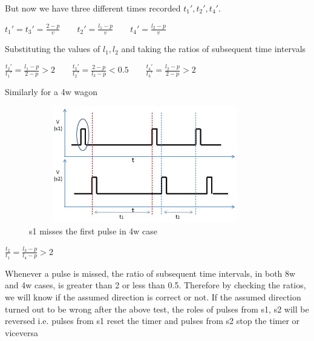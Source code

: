 \documentclass[aps,letterpaper,11pt]{article}
\begin{document}
But now we have three different times recorded $t_1', t_2', t_4'$.
\begin{center}
$
t_1' = t_3' =\frac{2-p}{v} \qquad
t_2' = \frac{l_1-p}{v} \qquad
t_4' = \frac{l_2-p}{v}
$
\end{center}
Substituting the values of $l_1, l_2$ and taking the ratios of subsequent time
intervals
\begin{center}
$
\frac{t_2'}{t_1'} = \frac{l_1-p}{2-p} > 2 \qquad
\frac{t_3'}{t_2'} = \frac{2-p}{l_2-p} < 0.5 \qquad \frac{t_4'}{t_3'} = \frac{l_2-p}{2-p} > 2 $
\end{center}
\mbox{}
Similarly for a 4w wagon
\begin{figure}[H]
\begin{center}
\includegraphics[height = 2in,width=4in,angle=00]{figures/w4_1_pulse_missing.JPG}
\caption{\small s1 misses the first pulse in 4w case}
\end{center}
\end{figure}
\begin{center}$\frac{t_2}{t_1} = \frac{l_3-p}{l_4-p} > 2 $ \end{center}
Whenever a pulse is missed, the ratio of subsequent time intervals, in both 8w and 4w cases, is greater than 2 or less than 0.5. Therefore by checking the ratios, we will know if the assumed direction is correct or not. If the assumed direction turned out to be wrong after the above test, the roles of pulses from s1, s2 will be reversed i.e. pulses from s1 reset the timer and pulses from s2 stop the timer or viceversa \\ \\
\end{document}
